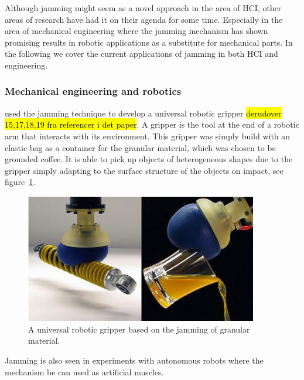 Although jamming might seem as a novel approach in the area of HCI, other areas of research have had it on their agenda for some time. 
Especially in the area of mechanical engineering where the jamming mechanism has shown promising results in robotic applications as a substitute for mechanical parts.
In the following we cover the current applications of jamming in both HCI and engineering. 

\subsubsection{Mechanical engineering and robotics}

\citet{brown2010universal, amend2012positive} used the jamming technique to develop a universal robotic gripper \hl{derudover 15,17,18,19 fra referencer i det paper}. 
A gripper is the tool at the end of a robotic arm that interacts with its environment.
This gripper was simply build with an elastic bag as a container for the granular material, which was chosen to be grounded coffee. 
It is able to pick up objects of heterogeneous shapes due to the gripper simply adapting to the surface structure of the objects on impact, see figure~\ref{fig:ch:jamming:jamming-robot-gripper}. 

\begin{figure}
	\centering
  		\includegraphics[width=4in]{figures/jamming/jamming-robot-gripper}
	\caption[A universal robotic gripper based on the jamming of granular material by \citet{brown2010universal}.]
   {A universal robotic gripper based on the jamming of granular material.}
   \label{fig:ch:jamming:jamming-robot-gripper}
\end{figure}

Jamming is also seen in experiments with autonomous robots where the mechanism be can used as artificial muscles.

